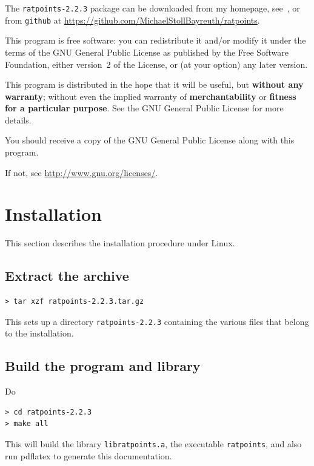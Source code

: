 \documentclass[12pt,a4paper,oneside]{amsart}
\newcommand{\rpversion}{2.2.3} %
\begin{document}
The \texttt{ratpoints-\rpversion} package can be downloaded from my homepage,
see~\cite{ratpoints}, or from \texttt{github} at
\url{https://github.com/MichaelStollBayreuth/ratpoints}.

This program is free software: you can redistribute it and/or modify
it under the terms of the GNU General Public License as published
by the Free Software Foundation, either version~2 of the License, or
(at your option) any later version.

This program is distributed in the hope that it will be useful,
but \textbf{without any warranty}; without even the implied warranty of
\textbf{merchantability} or \textbf{fitness for a particular purpose}. See the
GNU General Public License for more details.

You should receive a copy of the GNU General Public License
along with this program.

If not, see \url{http://www.gnu.org/licenses/}.


\section{Installation}

This section describes the installation procedure under Linux.

\subsection{Extract the archive}

\begin{verbatim}
> tar xzf ratpoints-2.2.3.tar.gz
\end{verbatim}

This sets up a directory \texttt{ratpoints-\rpversion} containing the various
files that belong to the installation.

\subsection{Build the program and library}

Do

\begin{verbatim}
> cd ratpoints-2.2.3
> make all
\end{verbatim}

This will build the library \texttt{libratpoints.a}, the executable
\texttt{ratpoints}, and also run pdf\/latex to generate this documentation.
\end{document}
